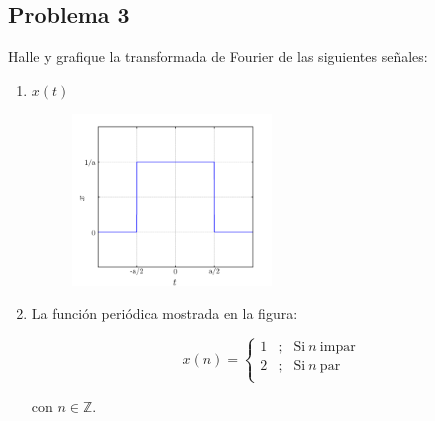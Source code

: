 \documentclass[a4paper,12pt,final]{article}
\begin{document}
  \newpage
  \subsection*{Problema 3}

    \noindent Halle y grafique la transformada de Fourier de las siguientes señales:
      \begin{enumerate}[label=\alph*)]
        \item $x\left(t\right)$

          \begin{figure}[H]
            \begin{center}
              \includegraphics[width=0.5\textwidth]{./laboratorio_4/problema03_a.png}
            \end{center}
          \end{figure}\vspace{-1.5em}

        \item La función periódica mostrada en la figura:

          \begin{equation*}
            x\left(n\right) = \left\{
              \begin{array}{ccl}
                1 & ; & \mathrm{Si}\ n\ \mathrm{impar}\\
                2 & ; & \mathrm{Si}\ n\ \mathrm{par}\\
              \end{array}
            \right.
          \end{equation*}

          con $n \in \mathbb{Z}$.


\end{enumerate}
\end{document}

